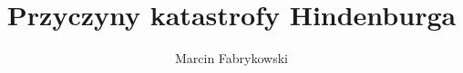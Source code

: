 \documentclass{beamer}
\author{Marcin Fabrykowski}
\title{Przyczyny katastrofy Hindenburga}
\begin{document}
\begin{frame}
\maketitle
\end{frame}
\end{document}
